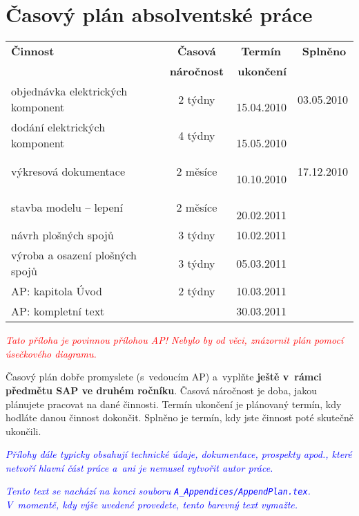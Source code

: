 ﻿\chapter{Časový plán absolventské práce \label{ch:ApendPLAN}}


\begin{center}
\begin{tabular}{|p{8cm}|c|r|r|}
  \hline
  \textbf{\hspace{3.3cm} Činnost} & \textbf{Časová} & \textbf{Termín\,\,\,} & \textbf{Splněno\,} \\
  {} & \textbf{náročnost} & \textbf{ukončení} & {} \\
  \hline

  {objednávka elektrických komponent}
                & {2 týdny} & \,{15.04.2010} & {03.05.2010} \\\hline
  {dodání elektrických komponent}
                & {4 týdny} & \,{15.05.2010} & {} \\\hline
  {výkresová dokumentace}
                & {2 měsíce} & \,{10.10.2010} & {17.12.2010} \\\hline
  {stavba modelu -- lepení}
                & {2 měsíce} & \,{20.02.2011} & {} \\\hline
  {návrh plošných spojů}
                & {3 týdny} & {10.02.2011} & {} \\\hline
  {výroba a osazení plošných spojů}
                & {3 týdny} & {05.03.2011} & {} \\\hline
  {AP: kapitola Úvod}
                & {2 týdny} & {10.03.2011} & {} \\\hline
  {AP: kompletní text}
                & {} & {30.03.2011} & {} \\\hline
\end{tabular}
\end{center}





\textcolor{red}{\em Tato příloha je povinnou přílohou AP! Nebylo by od věci, znázornit plán pomocí úsečkového diagramu.\/}

Časový plán dobře promyslete (s~vedoucím AP) a~vyplňte \textbf{ještě v~rámci předmětu SAP ve druhém ročníku}. Časová náročnost je doba, jakou plánujete pracovat na dané činnosti. Termín ukončení je plánovaný termín, kdy hodláte danou činnost dokončit. Splněno je termín, kdy jste činnost poté skutečně ukončili.

\textcolor{blue}{\em Přílohy dále typicky obsahují technické údaje, dokumentace, prospekty apod., kte\-ré netvoří hlavní část práce a~ani je nemusel vytvořit autor práce.\/}

\textcolor{blue}{\em Tento text se nachází na konci souboru \texttt{A\_Appendices/AppendPlan.tex}. V~momentě, kdy výše uvedené provedete, tento barevný text vymažte.\/} 
